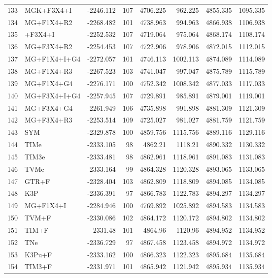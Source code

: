 \begin{longtable}{clrrrrrr}
	133 & MGK+F3X4+I & -2246.112 & 107 & 4706.225 & 962.225 & 4855.335 & 1095.335 \\ 
	134 & MG+F1X4+R2 & -2268.482 & 101 & 4738.963 & 994.963 & 4866.938 & 1106.938 \\ 
	135 & \gy+F3X4+I & -2252.532 & 107 & 4719.064 & 975.064 & 4868.174 & 1108.174 \\ 
	136 & MG+F3X4+R2 & -2254.453 & 107 & 4722.906 & 978.906 & 4872.015 & 1112.015 \\ 
	137 & MG+F1X4+I+G4 & -2272.057 & 101 & 4746.113 & 1002.113 & 4874.089 & 1114.089 \\ 
	138 & MG+F1X4+R3 & -2267.523 & 103 & 4741.047 & 997.047 & 4875.789 & 1115.789 \\ 
	139 & MG+F1X4+G4 & -2276.171 & 100 & 4752.342 & 1008.342 & 4877.033 & 1117.033 \\ 
	140 & MG+F3X4+I+G4 & -2257.945 & 107 & 4729.891 & 985.891 & 4879.001 & 1119.001 \\ 
	141 & MG+F3X4+G4 & -2261.949 & 106 & 4735.898 & 991.898 & 4881.309 & 1121.309 \\ 
	142 & MG+F3X4+R3 & -2253.514 & 109 & 4725.027 & 981.027 & 4881.759 & 1121.759 \\ 
	143 & SYM & -2329.878 & 100 & 4859.756 & 1115.756 & 4889.116 & 1129.116 \\ 
	144 & TIMe & -2333.105 & 98 & 4862.21 & 1118.21 & 4890.332 & 1130.332 \\ 
	145 & TIM3e & -2333.481 & 98 & 4862.961 & 1118.961 & 4891.083 & 1131.083 \\ 
	146 & TVMe & -2333.164 & 99 & 4864.328 & 1120.328 & 4893.065 & 1133.065 \\ 
	147 & GTR+F & -2328.404 & 103 & 4862.809 & 1118.809 & 4894.085 & 1134.085 \\ 
	148 & K3P & -2336.391 & 97 & 4866.783 & 1122.783 & 4894.297 & 1134.297 \\ 
	149 & MG+F1X4+I & -2284.946 & 100 & 4769.892 & 1025.892 & 4894.583 & 1134.583 \\ 
	150 & TVM+F & -2330.086 & 102 & 4864.172 & 1120.172 & 4894.802 & 1134.802 \\ 
	151 & TIM+F & -2331.48 & 101 & 4864.96 & 1120.96 & 4894.952 & 1134.952 \\ 
	152 & TNe & -2336.729 & 97 & 4867.458 & 1123.458 & 4894.972 & 1134.972 \\ 
	153 & K3Pu+F & -2333.162 & 100 & 4866.323 & 1122.323 & 4895.684 & 1135.684 \\ 
	154 & TIM3+F & -2331.971 & 101 & 4865.942 & 1121.942 & 4895.934 & 1135.934 \\ 

\end{longtable}
